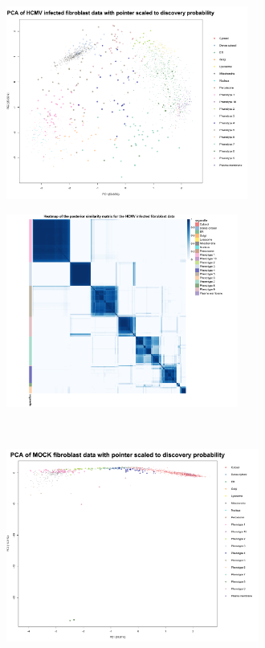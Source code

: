 \documentclass[12pt,english]{article}
\begin{document}
\begin{figure}
\begin{subfigure}[t]{0.5\textwidth}
	\centering
	\includegraphics[height=2.5in]{pcaBeltranH.pdf}
	\caption{}
\end{subfigure}	
\begin{subfigure}[t]{0.5\textwidth}
	\centering
	\includegraphics[height=2.5in]{HeatmapHCMV.pdf}
	\caption{}
\end{subfigure}
~
\begin{subfigure}[t]{0.5\textwidth}
	\centering
	\includegraphics[height=2.5in]{pcaMOCK.pdf}
	\caption{}
\end{subfigure}
\begin{subfigure}[t]{0.5\textwidth}

\end{subfigure}
\end{figure}
\end{document}
